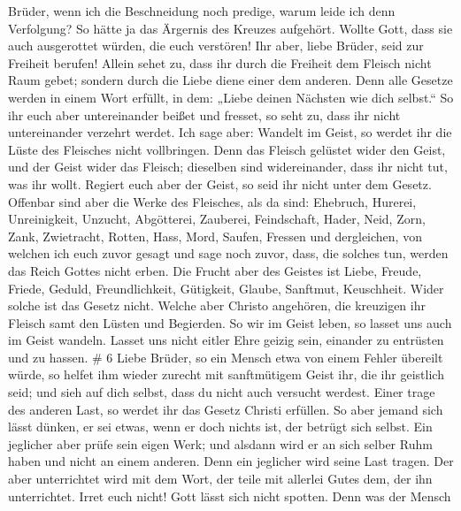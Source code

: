 Brüder, wenn ich die Beschneidung noch predige, warum leide ich denn
Verfolgung? So hätte ja das Ärgernis des Kreuzes aufgehört.
 Wollte Gott, dass sie auch ausgerottet würden, die euch
verstören!  Ihr aber, liebe Brüder, seid zur Freiheit
berufen! Allein sehet zu, dass ihr durch die Freiheit dem Fleisch nicht
Raum gebet; sondern durch die Liebe diene einer dem anderen.
 Denn alle Gesetze werden in einem Wort erfüllt, in dem:
„Liebe deinen Nächsten wie dich selbst.``  So ihr euch aber
untereinander beißet und fresset, so seht zu, dass ihr nicht
untereinander verzehrt werdet.  Ich sage aber: Wandelt im
Geist, so werdet ihr die Lüste des Fleisches nicht vollbringen.
 Denn das Fleisch gelüstet wider den Geist, und der Geist
wider das Fleisch; dieselben sind widereinander, dass ihr nicht tut, was
ihr wollt.  Regiert euch aber der Geist, so seid ihr nicht
unter dem Gesetz.  Offenbar sind aber die Werke des
Fleisches, als da sind: Ehebruch, Hurerei, Unreinigkeit, Unzucht,
 Abgötterei, Zauberei, Feindschaft, Hader, Neid, Zorn,
Zank, Zwietracht, Rotten, Hass, Mord,  Saufen, Fressen und
dergleichen, von welchen ich euch zuvor gesagt und sage noch zuvor,
dass, die solches tun, werden das Reich Gottes nicht erben.
 Die Frucht aber des Geistes ist Liebe, Freude, Friede,
Geduld, Freundlichkeit, Gütigkeit, Glaube, Sanftmut, Keuschheit.
 Wider solche ist das Gesetz nicht.  Welche
aber Christo angehören, die kreuzigen ihr Fleisch samt den Lüsten und
Begierden.  So wir im Geist leben, so lasset uns auch im
Geist wandeln.  Lasset uns nicht eitler Ehre geizig sein,
einander zu entrüsten und zu hassen. \# 6  Liebe Brüder, so
ein Mensch etwa von einem Fehler übereilt würde, so helfet ihm wieder
zurecht mit sanftmütigem Geist ihr, die ihr geistlich seid; und sieh auf
dich selbst, dass du nicht auch versucht werdest.  Einer
trage des anderen Last, so werdet ihr das Gesetz Christi erfüllen.
 So aber jemand sich lässt dünken, er sei etwas, wenn er
doch nichts ist, der betrügt sich selbst.  Ein jeglicher
aber prüfe sein eigen Werk; und alsdann wird er an sich selber Ruhm
haben und nicht an einem anderen.  Denn ein jeglicher wird
seine Last tragen.  Der aber unterrichtet wird mit dem Wort,
der teile mit allerlei Gutes dem, der ihn unterrichtet. 
Irret euch nicht! Gott lässt sich nicht spotten. Denn was der Mensch
